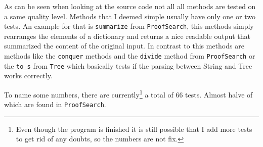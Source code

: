 As can be seen when looking at the source code not all all methods are tested on a same quality level. Methods that I deemed simple usually have only one or two tests. An example for that is \texttt{summarize} from \texttt{ProofSearch}, this methods simply rearranges the elements of a dictionary and returns a nice readable output that summarized the content of the original input. In contrast to this methods are methods like the \texttt{conquer} methods and the \texttt{divide} method from \texttt{ProofSearch} or the \texttt{to\_s} from \texttt{Tree} which basically tests if the parsing between String and Tree works correctly.

To name some numbers, there are currently\footnote{Even though the program is finished it is still possible that I add more tests to get rid of any doubts, so the numbers are not fix.} a total of 66 tests. Almost halve of which are found in \texttt{ProofSearch}. 